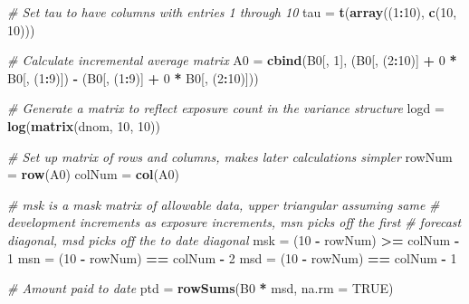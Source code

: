 \documentclass[]{article}
\newenvironment{Shaded}{\begin{snugshade}}{\end{snugshade}}
\newcommand{\CommentTok}[1]{\textcolor[rgb]{0.56,0.35,0.01}{\textit{#1}}}
\newcommand{\DataTypeTok}[1]{\textcolor[rgb]{0.13,0.29,0.53}{#1}}
\newcommand{\DecValTok}[1]{\textcolor[rgb]{0.00,0.00,0.81}{#1}}
\newcommand{\KeywordTok}[1]{\textcolor[rgb]{0.13,0.29,0.53}{\textbf{#1}}}
\newcommand{\NormalTok}[1]{#1}
\newcommand{\OperatorTok}[1]{\textcolor[rgb]{0.81,0.36,0.00}{\textbf{#1}}}
\newcommand{\OtherTok}[1]{\textcolor[rgb]{0.56,0.35,0.01}{#1}}
\newcommand{\StringTok}[1]{\textcolor[rgb]{0.31,0.60,0.02}{#1}}
\begin{document}
\begin{Shaded}
\begin{Highlighting}[]
\CommentTok{# Set tau to have columns with entries 1 through 10}
\NormalTok{tau =}\StringTok{ }\KeywordTok{t}\NormalTok{(}\KeywordTok{array}\NormalTok{((}\DecValTok{1}\OperatorTok{:}\DecValTok{10}\NormalTok{), }\KeywordTok{c}\NormalTok{(}\DecValTok{10}\NormalTok{, }\DecValTok{10}\NormalTok{)))}

\CommentTok{# Calculate incremental average matrix}
\NormalTok{A0 =}\StringTok{ }\KeywordTok{cbind}\NormalTok{(B0[, }\DecValTok{1}\NormalTok{], (B0[, (}\DecValTok{2}\OperatorTok{:}\DecValTok{10}\NormalTok{)] }\OperatorTok{+}\StringTok{ }\DecValTok{0} \OperatorTok{*}\StringTok{ }\NormalTok{B0[, (}\DecValTok{1}\OperatorTok{:}\DecValTok{9}\NormalTok{)]) }\OperatorTok{-}
\StringTok{             }\NormalTok{(B0[, (}\DecValTok{1}\OperatorTok{:}\DecValTok{9}\NormalTok{)] }\OperatorTok{+}\StringTok{ }\DecValTok{0} \OperatorTok{*}\StringTok{ }\NormalTok{B0[, (}\DecValTok{2}\OperatorTok{:}\DecValTok{10}\NormalTok{)]))}

\CommentTok{# Generate a matrix to reflect exposure count in the variance structure}
\NormalTok{logd =}\StringTok{ }\KeywordTok{log}\NormalTok{(}\KeywordTok{matrix}\NormalTok{(dnom, }\DecValTok{10}\NormalTok{, }\DecValTok{10}\NormalTok{))}

\CommentTok{# Set up matrix of rows and columns, makes later calculations simpler}
\NormalTok{rowNum =}\StringTok{ }\KeywordTok{row}\NormalTok{(A0)}
\NormalTok{colNum =}\StringTok{ }\KeywordTok{col}\NormalTok{(A0)}

\CommentTok{# msk is a mask matrix of allowable data, upper triangular assuming same}
\CommentTok{# development increments as exposure increments, msn picks off the first}
\CommentTok{# forecast diagonal, msd picks off the to date diagonal}
\NormalTok{msk =}\StringTok{ }\NormalTok{(}\DecValTok{10} \OperatorTok{-}\StringTok{ }\NormalTok{rowNum) }\OperatorTok{>=}\StringTok{ }\NormalTok{colNum }\OperatorTok{-}\StringTok{ }\DecValTok{1}
\NormalTok{msn =}\StringTok{ }\NormalTok{(}\DecValTok{10} \OperatorTok{-}\StringTok{ }\NormalTok{rowNum) }\OperatorTok{==}\StringTok{ }\NormalTok{colNum }\OperatorTok{-}\StringTok{ }\DecValTok{2}
\NormalTok{msd =}\StringTok{ }\NormalTok{(}\DecValTok{10} \OperatorTok{-}\StringTok{ }\NormalTok{rowNum) }\OperatorTok{==}\StringTok{ }\NormalTok{colNum }\OperatorTok{-}\StringTok{ }\DecValTok{1}

\CommentTok{# Amount paid to date}
\NormalTok{ptd =}\StringTok{ }\KeywordTok{rowSums}\NormalTok{(B0 }\OperatorTok{*}\StringTok{ }\NormalTok{msd, }\DataTypeTok{na.rm =} \OtherTok{TRUE}\NormalTok{)}
\end{Highlighting}
\end{Shaded}
\end{document}
